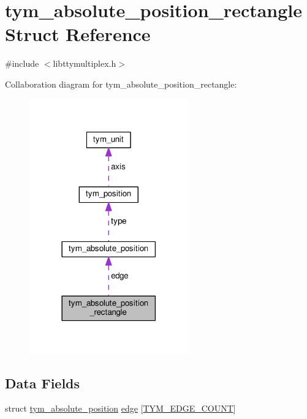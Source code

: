 \hypertarget{structtym__absolute__position__rectangle}{}\section{tym\+\_\+absolute\+\_\+position\+\_\+rectangle Struct Reference}
\label{structtym__absolute__position__rectangle}


{\ttfamily \#include $<$libttymultiplex.\+h$>$}



Collaboration diagram for tym\+\_\+absolute\+\_\+position\+\_\+rectangle\+:
\nopagebreak
\begin{figure}[H]
\begin{center}
\leavevmode
\includegraphics[width=194pt]{structtym__absolute__position__rectangle__coll__graph}
\end{center}
\end{figure}
\subsection*{Data Fields}
\begin{DoxyCompactItemize}
\item 
struct \hyperlink{structtym__absolute__position}{tym\+\_\+absolute\+\_\+position} \hyperlink{structtym__absolute__position__rectangle_a8ae5bbbd49e8293d8fa93df8d1572423}{edge} \mbox{[}\hyperlink{libttymultiplex_8h_ad8856480bf629c72938051528100b834ac0bfa9550b58bc257ca09715d719de7f}{T\+Y\+M\+\_\+\+E\+D\+G\+E\+\_\+\+C\+O\+U\+NT}\mbox{]}
\end{DoxyCompactItemize}


